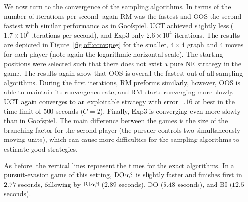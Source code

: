 We now turn to the convergence of the sampling algorithms.
In terms of the number of iterations per second, again RM was the fastest and OOS the second fastest with similar performance as in Goofspiel.
UCT achieved slightly less ($1.7\times10^5$ iterations per second), and Exp3 only $2.6\times10^4$ iterations.
The results are depicted in Figure~\ref{fig:off:conv:peg} for the smaller, $4\times4$ graph and $4$ moves for each player (note again the logarithmic horizontal scale).
The starting positions were selected such that there does not exist a pure NE strategy in the game.
The results again show that OOS is overall the fastest out of all sampling algorithms.
During the first iterations, RM preforms similarly, however, OOS is able to maintain its convergence rate, and  RM starts converging more slowly.
UCT again converges to an exploitable strategy with error $1.16$ at best in the time limit of $500$ seconds ($C=2$).
Finally, Exp3 is converging even more slowly than in Goofspiel.
The main difference between the games is the size of the branching factor for the second player (the pursuer controls two simultaneously moving units), which can cause more difficulties for the sampling algorithms to estimate good strategies.

As before, the vertical lines represent the times for the exact algorithms.
In a pursuit-evasion game of this setting, $\textrm{DO}\alpha\beta$ is slightly faster and finishes first in $2.77$ seconds, following by $\textrm{BI}\alpha\beta$ ($2.89$ seconds), \textsc{DO} ($5.48$ seconds), and \textsc{BI} ($12.5$ seconds).

